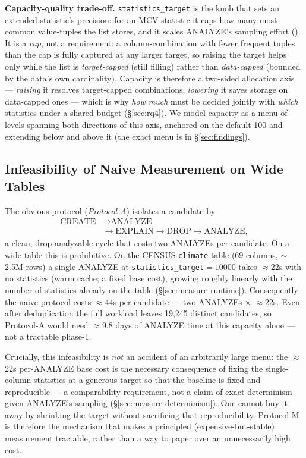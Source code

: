 \documentclass[sigconf, nonacm]{acmart}
\begin{document}
\textbf{Capacity-quality trade-off.} \texttt{statistics\_target} is the knob
that sets an extended statistic's precision: for an MCV statistic it caps how
many most-common value-tuples the list stores, and it scales ANALYZE's
sampling effort (\cite{pgstats}). It is a \emph{cap}, not a requirement: a
column-combination with fewer frequent tuples than the cap is fully captured at
any larger target, so raising the target helps only while the list is
\emph{target-capped} (still filling) rather than \emph{data-capped} (bounded by
the data's own cardinality). Capacity is therefore a two-sided allocation axis
--- \emph{raising} it resolves target-capped combinations, \emph{lowering} it
saves storage on data-capped ones --- which is why \emph{how much} must be
decided jointly with \emph{which} statistics under a shared budget
(\S\ref{sec:rq4}). We model capacity as a menu of levels spanning both
directions of this axis, anchored on the default 100 and extending below and
above it (the exact menu is in \S\ref{sec:findings}).

\subsection{Infeasibility of Naive Measurement on Wide Tables}
\label{sec:measure-naive}

The obvious protocol (\emph{Protocol-A}) isolates a candidate by
\[
  \begin{aligned}
    \text{CREATE} &\to \text{ANALYZE}\\
    &\to \text{EXPLAIN} \to \text{DROP} \to \text{ANALYZE},
  \end{aligned}
\]
a clean, drop-analyzable cycle that costs two ANALYZEs per candidate. On a wide
table this is prohibitive. On the CENSUS \texttt{climate} table (69 columns,
$\sim$2.5M rows) a single ANALYZE at \texttt{statistics\_target}\allowbreak$=10000$ takes
$\approx$22s with no statistics (warm cache; a fixed base cost), growing
roughly linearly with the number of statistics already on the table
(\S\ref{sec:measure-runtime}). Consequently the naive protocol
costs $\approx$44s per candidate --- two ANALYZEs $\times$ $\approx$22s. Even
after deduplication the full workload leaves 19{,}245 distinct candidates, so
Protocol-A would need $\approx$9.8 days of ANALYZE time at this capacity alone
--- not a tractable phase-1.

Crucially, this infeasibility is \emph{not} an accident of an arbitrarily
large menu: the $\approx$22s per-ANALYZE base cost is the necessary
consequence of fixing the single-column statistics at a generous target so
that the baseline is fixed and reproducible --- a comparability requirement,
not a claim of exact determinism given ANALYZE's sampling
(\S\ref{sec:measure-determinism}). One cannot buy it away by shrinking the
target without sacrificing that reproducibility. Protocol-M is therefore the
mechanism that makes a principled (expensive-but-stable) measurement
tractable, rather than a way to paper over an unnecessarily high cost.
\end{document}
